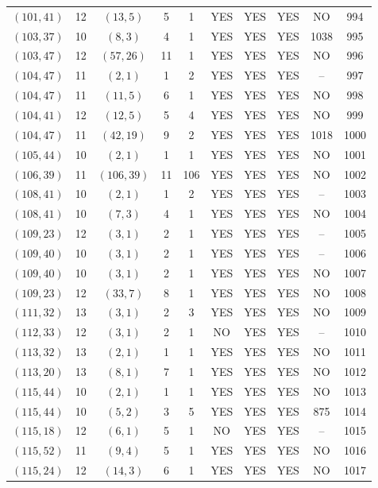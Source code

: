 \begin{longtable}{|c|c|c|c|c|c|c|c|c|c|}
$(101, 41)$ & 12 & $(13, 5)$ & 5 & 1 & YES & YES & YES & NO & 994\\
$(103, 37)$ & 10 & $(8, 3)$ & 4 & 1 & YES & YES & YES & 1038 & 995\\
$(103, 47)$ & 12 & $(57, 26)$ & 11 & 1 & YES & YES & YES & NO & 996\\
$(104, 47)$ & 11 & $(2, 1)$ & 1 & 2 & YES & YES & YES & -- & 997\\
$(104, 47)$ & 11 & $(11, 5)$ & 6 & 1 & YES & YES & YES & NO & 998\\
$(104, 41)$ & 12 & $(12, 5)$ & 5 & 4 & YES & YES & YES & NO & 999\\
$(104, 47)$ & 11 & $(42, 19)$ & 9 & 2 & YES & YES & YES & 1018 & 1000\\
$(105, 44)$ & 10 & $(2, 1)$ & 1 & 1 & YES & YES & YES & NO & 1001\\
$(106, 39)$ & 11 & $(106, 39)$ & 11 & 106 & YES & YES & YES & NO & 1002\\
$(108, 41)$ & 10 & $(2, 1)$ & 1 & 2 & YES & YES & YES & -- & 1003\\
$(108, 41)$ & 10 & $(7, 3)$ & 4 & 1 & YES & YES & YES & NO & 1004\\
$(109, 23)$ & 12 & $(3, 1)$ & 2 & 1 & YES & YES & YES & -- & 1005\\
$(109, 40)$ & 10 & $(3, 1)$ & 2 & 1 & YES & YES & YES & -- & 1006\\
$(109, 40)$ & 10 & $(3, 1)$ & 2 & 1 & YES & YES & YES & NO & 1007\\
$(109, 23)$ & 12 & $(33, 7)$ & 8 & 1 & YES & YES & YES & NO & 1008\\
$(111, 32)$ & 13 & $(3, 1)$ & 2 & 3 & YES & YES & YES & NO & 1009\\
$(112, 33)$ & 12 & $(3, 1)$ & 2 & 1 & NO & YES & YES & -- & 1010\\
$(113, 32)$ & 13 & $(2, 1)$ & 1 & 1 & YES & YES & YES & NO & 1011\\
$(113, 20)$ & 13 & $(8, 1)$ & 7 & 1 & YES & YES & YES & NO & 1012\\
$(115, 44)$ & 10 & $(2, 1)$ & 1 & 1 & YES & YES & YES & NO & 1013\\
$(115, 44)$ & 10 & $(5, 2)$ & 3 & 5 & YES & YES & YES & 875 & 1014\\
$(115, 18)$ & 12 & $(6, 1)$ & 5 & 1 & NO & YES & YES & -- & 1015\\
$(115, 52)$ & 11 & $(9, 4)$ & 5 & 1 & YES & YES & YES & NO & 1016\\
$(115, 24)$ & 12 & $(14, 3)$ & 6 & 1 & YES & YES & YES & NO & 1017\\

\end{longtable}
